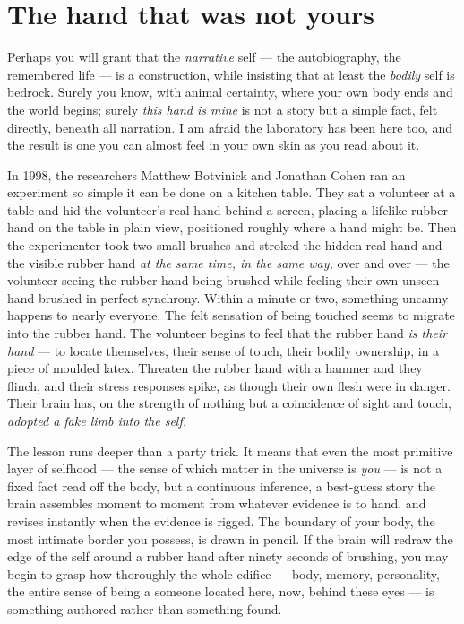 \section*{The hand that was not yours}

Perhaps you will grant that the \emph{narrative} self — the autobiography, the remembered life — is a construction, while insisting that at least the \emph{bodily} self is bedrock. Surely you know, with animal certainty, where your own body ends and the world begins; surely \emph{this hand is mine} is not a story but a simple fact, felt directly, beneath all narration. I am afraid the laboratory has been here too, and the result is one you can almost feel in your own skin as you read about it.

In 1998, the researchers Matthew Botvinick and Jonathan Cohen ran an experiment so simple it can be done on a kitchen table. They sat a volunteer at a table and hid the volunteer's real hand behind a screen, placing a lifelike rubber hand on the table in plain view, positioned roughly where a hand might be. Then the experimenter took two small brushes and stroked the hidden real hand and the visible rubber hand \emph{at the same time, in the same way,} over and over — the volunteer seeing the rubber hand being brushed while feeling their own unseen hand brushed in perfect synchrony. Within a minute or two, something uncanny happens to nearly everyone. The felt sensation of being touched seems to migrate into the rubber hand. The volunteer begins to feel that the rubber hand \emph{is their hand} — to locate themselves, their sense of touch, their bodily ownership, in a piece of moulded latex. Threaten the rubber hand with a hammer and they flinch, and their stress responses spike, as though their own flesh were in danger. Their brain has, on the strength of nothing but a coincidence of sight and touch, \emph{adopted a fake limb into the self.}

The lesson runs deeper than a party trick. It means that even the most primitive layer of selfhood — the sense of which matter in the universe is \emph{you} — is not a fixed fact read off the body, but a continuous inference, a best-guess story the brain assembles moment to moment from whatever evidence is to hand, and revises instantly when the evidence is rigged. The boundary of your body, the most intimate border you possess, is drawn in pencil. If the brain will redraw the edge of the self around a rubber hand after ninety seconds of brushing, you may begin to grasp how thoroughly the whole edifice — body, memory, personality, the entire sense of being a someone located here, now, behind these eyes — is something authored rather than something found.

